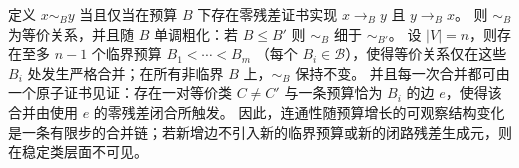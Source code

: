 \begin{conclusion}\label{con:xi-connectivity-hierarchy-finite-critical-budgets}
定义 \(x\sim_B y\) 当且仅当在预算 \(B\) 下存在零残差证书实现 \(x\to_B y\) 且 \(y\to_B x\)。
则 \(\sim_B\) 为等价关系，并且随 \(B\) 单调粗化：若 \(B\le B'\) 则 \(\sim_B\) 细于 \(\sim_{B'}\)。
设 \(|V|=n\)，则存在至多 \(n-1\) 个临界预算
\(
B_1<\cdots<B_m
\)
（每个 \(B_i\in\mathcal{B}\)），使得等价关系仅在这些 \(B_i\) 处发生严格合并；在所有非临界 \(B\) 上，\(\sim_B\) 保持不变。
并且每一次合并都可由一个原子证书见证：存在一对等价类 \(C\neq C'\) 与一条预算恰为 \(B_i\) 的边 \(e\)，使得该合并由使用 \(e\) 的零残差闭合所触发。
因此，连通性随预算增长的可观察结构变化是一条有限步的合并链；若新增边不引入新的临界预算或新的闭路残差生成元，则在稳定类层面不可见。
\end{conclusion}

